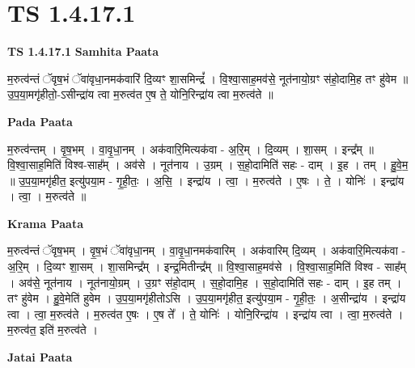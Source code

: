 \documentclass[17pt]{extarticle}
\begin{document}
\section*{ TS 1.4.17.1 }

\textbf{TS 1.4.17.1 } \newline
\textbf{Samhita Paata} \newline

म॒रुत्व॑न्तं ॅवृष॒भं ॅवा॑वृधा॒नमक॑वारिं दि॒व्यꣳ शा॒समिन्द्रं᳚ । वि॒श्वा॒साह॒मव॑से॒ नूत॑नायो॒ग्रꣳ स॑हो॒दामि॒ह तꣳ हु॑वेम ॥ उ॒प॒या॒मगृ॑हीतो॒-ऽसीन्द्रा॑य त्वा म॒रुत्व॑त ए॒ष ते॒ योनि॒रिन्द्रा॑य त्वा म॒रुत्व॑ते ॥ \newline

\textbf{Pada Paata} \newline

म॒रुत्व॑न्तम् । वृ॒ष॒भम् । वा॒वृ॒धा॒नम् । अक॑वारि॒मित्यक॑वा - अ॒रि॒म् । दि॒व्यम् । शा॒सम् । इन्द्र᳚म् ॥ वि॒श्वा॒साह॒मिति॑ विश्व-साह᳚म् । अव॑से । नूत॑नाय । उ॒ग्रम् । स॒हो॒दामिति॑ सहः - दाम् । इ॒ह । तम् । हु॒वे॒म॒ ॥ उ॒प॒या॒मगृ॑हीत॒ इत्यु॑पया॒म - गृ॒ही॒तः॒ । अ॒सि॒ । इन्द्रा॑य । त्वा॒ । म॒रुत्व॑ते । ए॒षः । ते॒ । योनिः॑ । इन्द्रा॑य । त्वा॒ । म॒रुत्व॑ते ॥  \newline


\textbf{Krama Paata} \newline

म॒रुत्व॑न्तं ॅवृष॒भम् । वृ॒ष॒भं ॅवा॑वृधा॒नम् । वा॒वृ॒धा॒नमक॑वारिम् । अक॑वारिम् दि॒व्यम् । अक॑वारि॒मित्यक॑वा - अ॒रि॒म् । दि॒व्यꣳ शा॒सम् । शा॒समिन्द्र᳚म् । इन्द्र॒मितीन्द्र᳚म् ॥ वि॒श्वा॒साह॒मव॑से । वि॒श्वा॒साह॒मिति॑ विश्व - साह᳚म् । अव॑से॒ नूत॑नाय । नूत॑नायो॒ग्रम् । उ॒ग्रꣳ स॑हो॒दाम् । स॒हो॒दामि॒ह । स॒हो॒दामिति॑ सहः - दाम् । इ॒ह तम् । तꣳ हु॑वेम । हु॒वे॒मेति॑ हुवेम । उ॒प॒या॒मगृ॑हीतोऽसि । उ॒प॒या॒मगृ॑हीत॒ इत्यु॑पया॒म - गृ॒ही॒तः॒ । अ॒सीन्द्रा॑य । इन्द्रा॑य त्वा । त्वा॒ म॒रुत्व॑ते । म॒रुत्व॑त ए॒षः । ए॒ष ते᳚ । ते॒ योनिः॑ । योनि॒रिन्द्रा॑य । इन्द्रा॑य त्वा । त्वा॒ म॒रुत्व॑ते । म॒रुत्व॑त॒ इति॑ म॒रुत्व॑ते । \newline

\textbf{Jatai Paata} \newline
\end{document}
